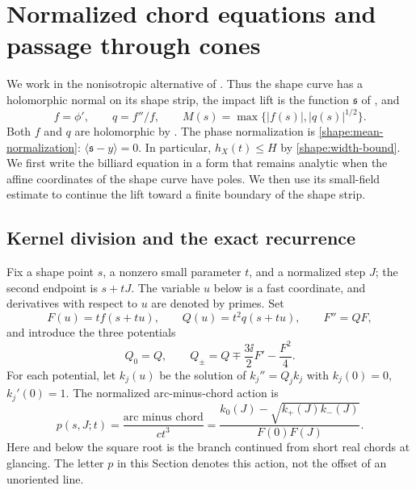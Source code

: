 \section{Normalized chord equations and passage through cones}
\label{sec:cones}

We work in the nonisotropic alternative of
. Thus the shape curve has a holomorphic
normal on its shape strip, the impact lift is the function
\(\mathfrak s\) of , and
\[
 f=\phi',\qquad q=f''/f,\qquad
 M(s)=\max\{|f(s)|,|q(s)|^{1/2}\}.
\]
Both \(f\) and \(q\) are holomorphic by .
The phase normalization is \eqref{shape:mean-normalization}:
\(\langle\mathfrak s-y\rangle=0\). In particular,
\(h_X(t)\le H\) by \eqref{shape:width-bound}. We first write the billiard equation in a form that
remains analytic when the affine coordinates of the shape curve have
poles. We then use its small-field estimate to continue the lift toward a
finite boundary of the shape strip.

\subsection{Kernel division and the exact recurrence}

Fix a shape point \(s\), a nonzero small parameter \(t\), and a normalized
step \(J\); the second endpoint is \(s+tJ\). The variable \(u\) below is a
fast coordinate, and derivatives with respect to \(u\) are denoted by
primes. Set
\begin{equation}\label{cone:fast-fields}
 F(u)=t f(s+tu),\qquad Q(u)=t^2q(s+tu),\qquad F''=QF,
\end{equation}
and introduce the three potentials
\begin{equation}\label{cone:kernel-potentials}
 Q_0=Q,\qquad Q_\pm=Q\mp\frac{3\ii}{2}F'-\frac{F^2}{4}.
\end{equation}
For each potential, let \(k_j(u)\) be the solution of
\(k_j''=Q_jk_j\) with \(k_j(0)=0\), \(k_j'(0)=1\).
The normalized arc-minus-chord action is
\begin{equation}\label{cone:kernel-action}
 p(s,J;t)=\frac{\text{arc minus chord}}{ct^3}
 =\frac{k_0(J)-\sqrt{k_+(J)k_-(J)}}{F(0)F(J)}.
\end{equation}
Here and below the square root is the branch continued from short real
chords at glancing. The letter \(p\) in this Section denotes this action,
not the offset of an unoriented line.

